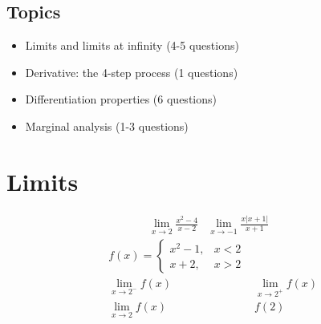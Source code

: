 \documentclass[12pt]{extarticle}
\begin{document}
\subsection{Topics}
\begin{itemize}
	\item Limits and limits at infinity (4-5 questions)
	\item Derivative: the 4-step process (1 questions)
	\item Differentiation properties (6 questions)
	\item Marginal analysis (1-3 questions)
\end{itemize}


\section{Limits}
\begin{align*}
	&\lim_{x\to 2} \frac{x^2-4}{x-2}	& \lim_{x\to -1}\frac{x|x+1|}{x+1}&
\end{align*}
\begin{align*}
	&f(x) =
	\begin{cases}
		x^2-1,  & x <2\\
		x+2, & x>2
	\end{cases} \\
	&\lim_{x \to 2^-} f(x)
	&\lim_{x \to 2^+} f(x)	\\
	&\lim_{x \to 2} f(x)
	&f(2)
\end{align*}
\vspace{1cm}
\end{document}
